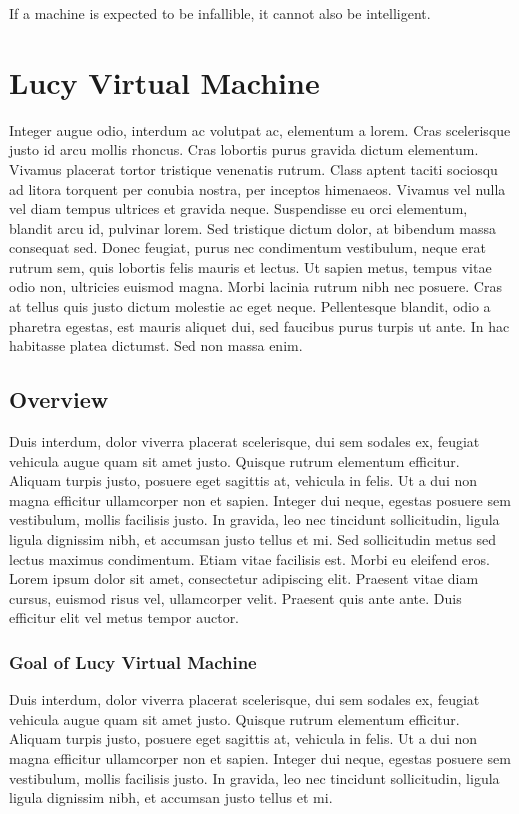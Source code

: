 \begin{savequote}[75mm]
If a machine is expected to be infallible, it cannot also be intelligent.
\end{savequote}

\chapter{Lucy Virtual Machine}
Integer augue odio, interdum ac volutpat ac, elementum a lorem. Cras scelerisque justo id arcu mollis rhoncus. Cras lobortis purus gravida dictum elementum. Vivamus placerat tortor tristique venenatis rutrum. Class aptent taciti sociosqu ad litora torquent per conubia nostra, per inceptos himenaeos. Vivamus vel nulla vel diam tempus ultrices et gravida neque. Suspendisse eu orci elementum, blandit arcu id, pulvinar lorem. Sed tristique dictum dolor, at bibendum massa consequat sed. Donec feugiat, purus nec condimentum vestibulum, neque erat rutrum sem, quis lobortis felis mauris et lectus. Ut sapien metus, tempus vitae odio non, ultricies euismod magna. Morbi lacinia rutrum nibh nec posuere. Cras at tellus quis justo dictum molestie ac eget neque. Pellentesque blandit, odio a pharetra egestas, est mauris aliquet dui, sed faucibus purus turpis ut ante. In hac habitasse platea dictumst. Sed non massa enim.

\section{Overview}
Duis interdum, dolor viverra placerat scelerisque, dui sem sodales ex, feugiat vehicula augue quam sit amet justo. Quisque rutrum elementum efficitur. Aliquam turpis justo, posuere eget sagittis at, vehicula in felis. Ut a dui non magna efficitur ullamcorper non et sapien. Integer dui neque, egestas posuere sem vestibulum, mollis facilisis justo. In gravida, leo nec tincidunt sollicitudin, ligula ligula dignissim nibh, et accumsan justo tellus et mi. Sed sollicitudin metus sed lectus maximus condimentum. Etiam vitae facilisis est. Morbi eu eleifend eros. Lorem ipsum dolor sit amet, consectetur adipiscing elit. Praesent vitae diam cursus, euismod risus vel, ullamcorper velit. Praesent quis ante ante. Duis efficitur elit vel metus tempor auctor.

\subsection{Goal of Lucy Virtual Machine}
Duis interdum, dolor viverra placerat scelerisque, dui sem sodales ex, feugiat vehicula augue quam sit amet justo. Quisque rutrum elementum efficitur. Aliquam turpis justo, posuere eget sagittis at, vehicula in felis. Ut a dui non magna efficitur ullamcorper non et sapien. Integer dui neque, egestas posuere sem vestibulum, mollis facilisis justo. In gravida, leo nec tincidunt sollicitudin, ligula ligula dignissim nibh, et accumsan justo tellus et mi.

